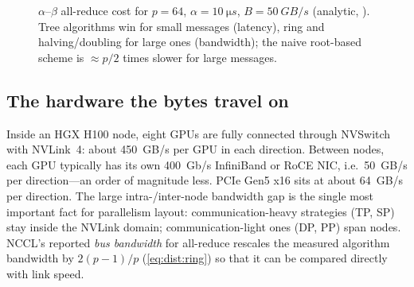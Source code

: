 \begin{figure}[t]
\centering
{}
\caption{$\alpha$--$\beta$ all-reduce cost for $p=64$, $\alpha=\SI{10}{\micro s}$,
$B=\SI{50}{GB/s}$ (analytic, ). Tree algorithms win for
small messages (latency), ring and halving/doubling for large ones (bandwidth); the naive
root-based scheme is $\approx p/2$ times slower for large messages.}
\label{fig:dist:arcost}
\end{figure}

\subsection{The hardware the bytes travel on}
Inside an HGX H100 node, eight GPUs are fully connected through NVSwitch with NVLink~4: about
\SI{450}{GB/s} per GPU in each direction. Between nodes, each GPU typically has its own
\SI{400}{Gb/s} InfiniBand or RoCE NIC, i.e.\ \SI{50}{GB/s} per direction---an order of magnitude
less. PCIe Gen5 x16 sits at about \SI{64}{GB/s} per direction. The large intra-/inter-node
bandwidth gap is the single most important fact for parallelism layout: communication-heavy
strategies (TP, SP) stay inside the NVLink domain; communication-light ones (DP, PP) span
nodes. NCCL's reported \emph{bus bandwidth} for all-reduce rescales the measured algorithm
bandwidth by $2(p-1)/p$ (\cref{eq:dist:ring}) so that it can be compared directly with link
speed.

